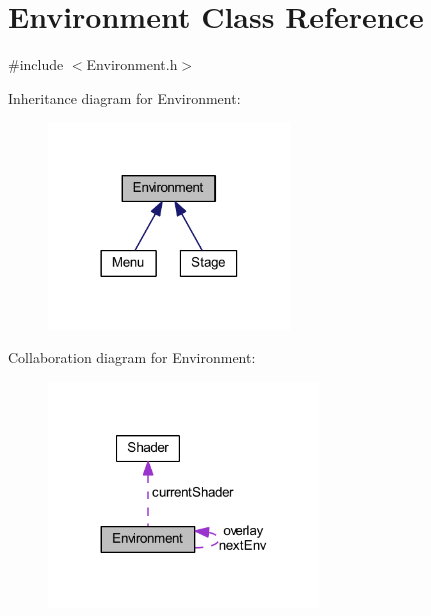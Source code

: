 \hypertarget{class_environment}{}\section{Environment Class Reference}
\label{class_environment}


{\ttfamily \#include $<$Environment.\+h$>$}



Inheritance diagram for Environment\+:
\nopagebreak
\begin{figure}[H]
\begin{center}
\leavevmode
\includegraphics[width=182pt]{class_environment__inherit__graph}
\end{center}
\end{figure}


Collaboration diagram for Environment\+:
\nopagebreak
\begin{figure}[H]
\begin{center}
\leavevmode
\includegraphics[width=203pt]{class_environment__coll__graph}
\end{center}
\end{figure}
